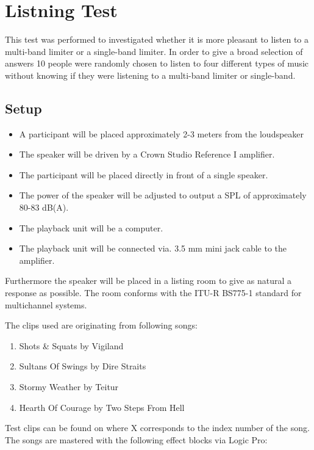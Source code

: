 \chapter{Listning Test}\label{app:journal_ListningTest}

This test was performed to investigated whether it is more pleasant to listen to a multi-band limiter or a single-band limiter. In order to give a broad selection of answers 10 people were randomly chosen to listen to four different types of music without knowing if they were listening to a multi-band limiter or single-band.

\section{Setup}

\begin{itemize}\addtolength{\itemsep}{-.35\baselineskip} 
\item A participant will be placed approximately 2-3 meters from the loudspeaker
\item The speaker will be driven by a Crown Studio Reference I amplifier.
\item The participant will be placed directly in front of a single speaker.
\item The power of the speaker will be adjusted to output a \gls{SPL} of approximately 80-83 dB(A).
\item The playback unit will be a computer.
\item The playback unit will be connected via. 3.5 mm mini jack cable to the amplifier.
\end{itemize}
\vspace{-5mm}
Furthermore the speaker will be placed in a listing room to give as natural a response as possible. The room conforms with the ITU-R BS775-1 standard for multichannel systems.

The clips used are originating from following songs:
\vspace{-5mm}
\begin{enumerate}\addtolength{\itemsep}{-.35\baselineskip} 
\item Shots \& Squats by Vigiland
\item Sultans Of Swings by Dire Straits
\item Stormy Weather by Teitur
\item Hearth Of Courage by Two Steps From Hell
\end{enumerate}
Test clips can be found on  where X corresponds to the index number of the song.
The songs are mastered with the following effect blocks via Logic Pro:

